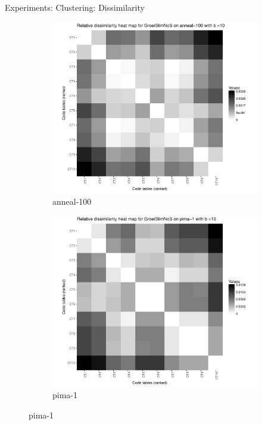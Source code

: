 \documentclass{beamer}
\begin{document}
\begin{frame}{Experiments: Clustering: Dissimilarity}
\begin{figure}
  \centering
  \begin{subfigure}[b]{0.45\textwidth}
    \includegraphics[width=\textwidth]{img/dissim-anneal-100}
    \caption{anneal-100}
  \end{subfigure}
    \begin{subfigure}[b]{0.45\textwidth}
    \includegraphics[width=\textwidth]{img/dissim-pima-1}
    \caption{pima-1}
  \end{subfigure}
\end{figure}
\end{frame}
\end{document}
